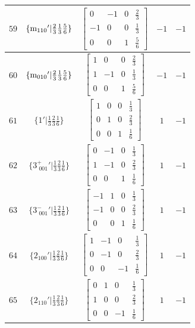 \documentclass[fleqn,8pt]{jsarticle}
\begin{document}
\begin{longtable}{ccccc}
$ 59 $ & $ \{{\rm m}_{110}{}'|\frac{2}{3} \frac{1}{3} \frac{5}{6}\} $ & $ \begin{bmatrix} 0 & -1 & 0 & \frac{2}{3} \\ -1 & 0 & 0 & \frac{1}{3} \\ 0 & 0 & 1 & \frac{5}{6} \end{bmatrix} $ & $ -1 $ & $ -1 $ \\ \hline
$ 60 $ & $ \{{\rm m}_{010}{}'|\frac{2}{3} \frac{1}{3} \frac{5}{6}\} $ & $ \begin{bmatrix} 1 & 0 & 0 & \frac{2}{3} \\ 1 & -1 & 0 & \frac{1}{3} \\ 0 & 0 & 1 & \frac{5}{6} \end{bmatrix} $ & $ -1 $ & $ -1 $ \\ \hline
$ 61 $ & $ \{1{}'|\frac{1}{3} \frac{2}{3} \frac{1}{6}\} $ & $ \begin{bmatrix} 1 & 0 & 0 & \frac{1}{3} \\ 0 & 1 & 0 & \frac{2}{3} \\ 0 & 0 & 1 & \frac{1}{6} \end{bmatrix} $ & $ 1 $ & $ -1 $ \\ \hline
$ 62 $ & $ \{3^{+}_{\,\,001}{}'|\frac{1}{3} \frac{2}{3} \frac{1}{6}\} $ & $ \begin{bmatrix} 0 & -1 & 0 & \frac{1}{3} \\ 1 & -1 & 0 & \frac{2}{3} \\ 0 & 0 & 1 & \frac{1}{6} \end{bmatrix} $ & $ 1 $ & $ -1 $ \\ \hline
$ 63 $ & $ \{3^{-}_{\,\,001}{}'|\frac{1}{3} \frac{2}{3} \frac{1}{6}\} $ & $ \begin{bmatrix} -1 & 1 & 0 & \frac{1}{3} \\ -1 & 0 & 0 & \frac{2}{3} \\ 0 & 0 & 1 & \frac{1}{6} \end{bmatrix} $ & $ 1 $ & $ -1 $ \\ \hline
$ 64 $ & $ \{2{}_{100}{}'|\frac{1}{3} \frac{2}{3} \frac{1}{6}\} $ & $ \begin{bmatrix} 1 & -1 & 0 & \frac{1}{3} \\ 0 & -1 & 0 & \frac{2}{3} \\ 0 & 0 & -1 & \frac{1}{6} \end{bmatrix} $ & $ 1 $ & $ -1 $ \\ \hline
$ 65 $ & $ \{2{}_{110}{}'|\frac{1}{3} \frac{2}{3} \frac{1}{6}\} $ & $ \begin{bmatrix} 0 & 1 & 0 & \frac{1}{3} \\ 1 & 0 & 0 & \frac{2}{3} \\ 0 & 0 & -1 & \frac{1}{6} \end{bmatrix} $ & $ 1 $ & $ -1 $ \\ \hline

\end{longtable}
\end{document}
